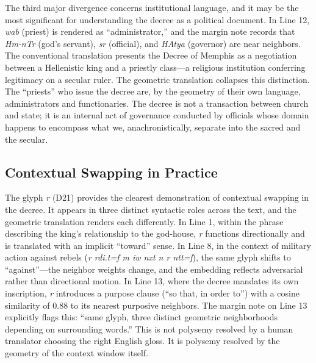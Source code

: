\documentclass[11pt, a4paper]{article}
\begin{document}
The third major divergence concerns institutional language, and it may be the most significant for understanding the decree as a political document. In Line 12, \textit{wab} (priest) is rendered as ``administrator,'' and the margin note records that \textit{Hm-nTr} (god's servant), \textit{sr} (official), and \textit{HAtya} (governor) are near neighbors. The conventional translation presents the Decree of Memphis as a negotiation between a Hellenistic king and a priestly class---a religious institution conferring legitimacy on a secular ruler. The geometric translation collapses this distinction. The ``priests'' who issue the decree are, by the geometry of their own language, administrators and functionaries. The decree is not a transaction between church and state; it is an internal act of governance conducted by officials whose domain happens to encompass what we, anachronistically, separate into the sacred and the secular.

\subsection{Contextual Swapping in Practice}

The glyph \textit{r} (D21) provides the clearest demonstration of contextual swapping in the decree. It appears in three distinct syntactic roles across the text, and the geometric translation renders each differently. In Line 1, within the phrase describing the king's relationship to the god-house, \textit{r} functions directionally and is translated with an implicit ``toward'' sense. In Line 8, in the context of military action against rebels (\textit{r rdi.t=f m iw nxt n r ntt=f}), the same glyph shifts to ``against''---the neighbor weights change, and the embedding reflects adversarial rather than directional motion. In Line 13, where the decree mandates its own inscription, \textit{r} introduces a purpose clause (``so that, in order to'') with a cosine similarity of 0.88 to its nearest purposive neighbors. The margin note on Line 13 explicitly flags this: ``same glyph, three distinct geometric neighborhoods depending on surrounding words.'' This is not polysemy resolved by a human translator choosing the right English gloss. It is polysemy resolved by the geometry of the context window itself.
\end{document}
